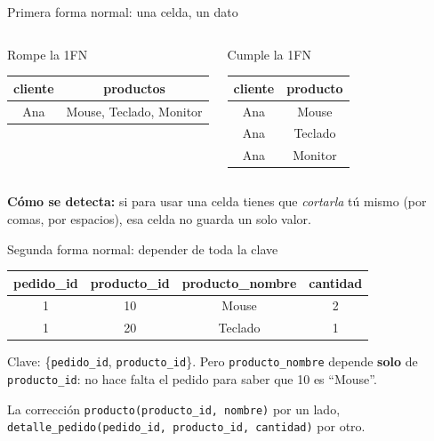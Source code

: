 \documentclass[aspectratio=169,10pt,c]{beamer}
\newcommand{\fn}[1]{\tikz[baseline=-0.5ex]{\node[rounded corners=2pt,fill=utpRojo,text=white,
  font=\bfseries\small,inner xsep=6pt,inner ysep=3pt] {#1};}}
\newcommand{\tbl}[1]{\textcolor{utpNaranja}{\texttt{#1}}}
\begin{document}
\begin{frame}{\fn{1FN} Primera forma normal: una celda, un dato}
\begin{columns}[T,onlytextwidth]
\begin{alertblock}{Rompe la 1FN}
\centering\footnotesize
\begin{tabular}{cc}
\toprule
\bfseries cliente & \bfseries productos \\
\midrule
Ana & Mouse, Teclado, Monitor \\
\bottomrule
\end{tabular}
\end{alertblock}
\begin{exampleblock}{Cumple la 1FN}
\centering\footnotesize
\begin{tabular}{cc}
\toprule
\bfseries cliente & \bfseries producto \\
\midrule
Ana & Mouse \\
Ana & Teclado \\
Ana & Monitor \\
\bottomrule
\end{tabular}
\end{exampleblock}
\end{columns}
\vspace{0.3cm}
\small \textbf{Cómo se detecta:} si para usar una celda tienes que \textit{cortarla} tú mismo (por comas, por espacios), esa celda no guarda un solo valor.
\end{frame}

\begin{frame}{\fn{2FN} Segunda forma normal: depender de toda la clave}
\begin{center}
\footnotesize\setlength\tabcolsep{7pt}
\begin{tabular}{cccc}
\toprule
\bfseries pedido\_id & \bfseries producto\_id & \bfseries producto\_nombre & \bfseries cantidad \\
\midrule
1 & 10 & Mouse   & 2 \\
1 & 20 & Teclado & 1 \\
\bottomrule
\end{tabular}
\end{center}
\vspace{0.15cm}
\small Clave: \{\texttt{pedido\_id}, \texttt{producto\_id}\}. Pero \texttt{producto\_nombre} depende \textbf{solo} de \texttt{producto\_id}: no hace falta el pedido para saber que 10 es ``Mouse''.
\vspace{0.1cm}
\begin{exampleblock}{La corrección}
\small \tbl{producto}\texttt{(producto\_id, nombre)} por un lado, \tbl{detalle\_pedido}\texttt{(pedido\_id, producto\_id, cantidad)} por otro.
\end{exampleblock}
\end{frame}
\end{document}
